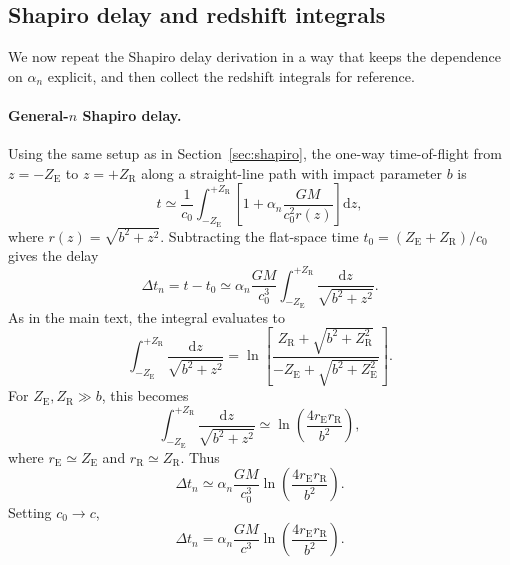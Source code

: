 \documentclass[11pt]{article}
\begin{document}
\subsection{Shapiro delay and redshift integrals}
\label{subsec:app-shapiro-redshift}

We now repeat the Shapiro delay derivation in a way that keeps the
dependence on $\alpha_n$ explicit, and then collect the redshift
integrals for reference.

\paragraph{General-\texorpdfstring{$n$}{n} Shapiro delay.}

Using the same setup as in Section~\ref{sec:shapiro}, the one-way
time-of-flight from $z=-Z_\mathrm{E}$ to $z=+Z_\mathrm{R}$ along a
straight-line path with impact parameter $b$ is
\begin{equation}
  t
  \simeq \frac{1}{c_0}
         \int_{-Z_\mathrm{E}}^{+Z_\mathrm{R}}
         \left[1 + \alpha_n \frac{GM}{c_0^2 r(z)}\right]\mathrm{d}z,
\end{equation}
where $r(z) = \sqrt{b^2+z^2}$.
Subtracting the flat-space time
$t_0 = (Z_\mathrm{E}+Z_\mathrm{R})/c_0$ gives the delay
\begin{equation}
  \Delta t_n
  = t - t_0
  \simeq \alpha_n \frac{GM}{c_0^3}
         \int_{-Z_\mathrm{E}}^{+Z_\mathrm{R}}
         \frac{\mathrm{d}z}{\sqrt{b^2+z^2}}.
\end{equation}
As in the main text, the integral evaluates to
\begin{equation}
  \int_{-Z_\mathrm{E}}^{+Z_\mathrm{R}}
  \frac{\mathrm{d}z}{\sqrt{b^2+z^2}}
  = \ln\!\left[
      \frac{Z_\mathrm{R} + \sqrt{b^2 + Z_\mathrm{R}^2}}
           {-Z_\mathrm{E} + \sqrt{b^2 + Z_\mathrm{E}^2}}
    \right].
\end{equation}
For $Z_\mathrm{E},Z_\mathrm{R}\gg b$, this becomes
\begin{equation}
  \int_{-Z_\mathrm{E}}^{+Z_\mathrm{R}}
  \frac{\mathrm{d}z}{\sqrt{b^2+z^2}}
  \simeq \ln\!\left(\frac{4 r_\mathrm{E} r_\mathrm{R}}{b^2}\right),
\end{equation}
where $r_\mathrm{E} \simeq Z_\mathrm{E}$ and $r_\mathrm{R}\simeq Z_\mathrm{R}$.
Thus
\begin{equation}
  \Delta t_n
  \simeq \alpha_n \frac{GM}{c_0^3}
         \ln\!\left(\frac{4 r_\mathrm{E} r_\mathrm{R}}{b^2}\right).
\end{equation}
Setting $c_0\to c$,
\begin{equation}
  \Delta t_n
  = \alpha_n \frac{GM}{c^3}
    \ln\!\left(\frac{4 r_\mathrm{E} r_\mathrm{R}}{b^2}\right).
  \label{eq:app-dt-n}
\end{equation}
\end{document}
